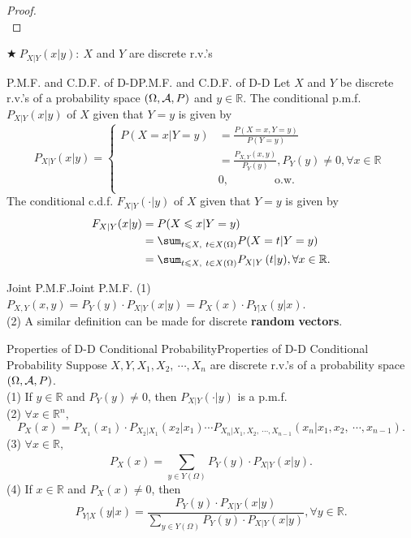 \documentclass{elegantbook}
\begin{document}
\begin{proof}
\\[4cm]\vspace{0.01cm}
\end{proof}

\(\bigstar\ P_{X|Y}(x|y):\ X\) and \(Y\) are discrete r.v.'s

\begin{definition}{P.M.F. and C.D.F. of D-D}{P.M.F. and C.D.F. of D-D}
Let \(X\) and \(Y\) be discrete r.v.'s of a probability space
$(\Omega,\mathcal{A}, P)$ and \(y \in \mathbb{R}\). The conditional p.m.f. \(P_{X|Y}(x|y)\) of \(X\) given that \(Y = y\) is given by
\[P_{X|Y}(x|y) = \left\{ \begin{aligned}
P( X = x | Y = y ) &= \frac{P(X = x,Y = y)}{P(Y = y)} \\
&= \frac{P_{X,Y}(x,y)}{P_{Y}(y)},P_{Y}(y) \neq 0,\forall x \in \mathbb{R} \\
&0, \qquad\qquad\mathrm{\text{o.w.}}\\
\end{aligned} \right.\ \]
The conditional c.d.f. \(F_{X|Y}\left( \cdot | y \right)\) of \(X\) given that \(Y = y\) is given by
\[\begin{aligned}
F_{X|Y}(x|y) &= P( X \ls x | Y = y )\\
& = \sum_{t \ls X ,\ t \in X(\Omega)}^{}{P( X = t | Y = y )} \\
&= \sum_{t \ls X ,\ t \in X(\Omega)}^{}{P_{X|Y}\left( t | y \right)},\forall x \in \mathbb{R}.
\end{aligned}\]
\end{definition}

\begin{remark}{Joint P.M.F.}{Joint P.M.F.}
(1) \(P_{X,Y}(x,y) = P_{Y}(y) \cdot P_{X|Y}(x|y) = P_{X}(x) \cdot P_{Y|X}(y|x)\).\\
(2) A similar def\/inition can be made for discrete \textbf{random} \textbf{vectors}.
\end{remark}

\begin{theorem}{Properties of D-D Conditional Probability}{Properties of D-D Conditional Probability}
Suppose \(X,Y,X_{1},X_{2},\ \cdots,X_{n}\) are discrete r.v.'s of a
probability space $(\Omega,\mathcal{A}, P)$.\\
(1) If \(y \in \mathbb{R}\) and \(P_{Y}(y) \neq 0\), then \(P_{X|Y}\left( \cdot | y \right)\) is a p.m.f.\\
(2) $\forall x \in \mathbb{R}^{n},$
 \[P_{X}(x) = P_{X_{1}}(x_{1}) \cdot P_{X_{2}|X_{1}}\left( x_{2}|x_{1} \right) \cdots P_{X_{n}|X_{1},X_{2},\ \cdots,X_{n - 1}}\left( x_{n}|x_{1},x_{2},\ \cdots,x_{n - 1} \right).\]
(3) $\forall x \in \mathbb{R},$
\[P_{X}(x) = \sum_{y \in Y(\Omega)}^{}{P_{Y}(y)} \cdot P_{X|Y}(x|y).\]
(4) If \(x \in \mathbb{R}\) and \(P_{X}(x) \neq 0\), then
\[P_{Y|X}(y|x) = \frac{P_{Y}(y) \cdot P_{X|Y}(x|y)}{\sum\limits_{y \in Y(\Omega)}^{}{P_{Y}(y)} \cdot P_{X|Y}(x|y)},\forall y \in \mathbb{R}.\]
\end{theorem}
\end{document}
